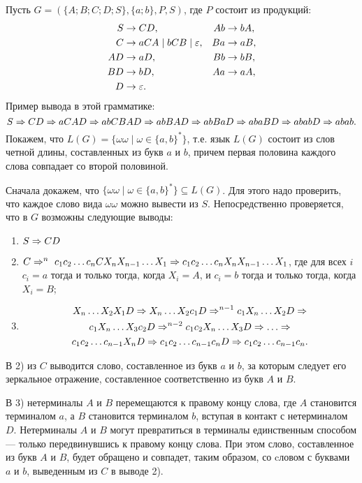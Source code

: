 \begin{myexample}
\label{exampleFreeGrammar}
Пусть $G=(\{A;B;C;D;S\},\{a;b\},P,S)$, где $P$ состоит из продукций:
\begin{align*}
	S  &\to CD, &
    Ab &\to bA, \\
	C  &\to aCA \mid bCB \mid \varepsilon, &
    Ba &\to aB, \\
	AD &\to aD, &
    Bb &\to bB, \\
	BD &\to bD, &
    Aa &\to aA,\\
	D  &\to \varepsilon.
\end{align*}
Пример вывода в этой грамматике:
\[
	S \Rightarrow CD \Rightarrow aCAD \Rightarrow abCBAD \Rightarrow abBAD \Rightarrow abBaD \Rightarrow abaBD \Rightarrow ababD \Rightarrow abab.
\]
Покажем, что $L(G)=\{\omega\omega\mid\omega\in\{a,b\}^*\}$, т.е. язык $L(G)$ состоит из слов четной длины, составленных из букв $a$ и $b$, причем первая половина каждого слова совпадает со второй половиной.

Сначала докажем, что $\{\omega\omega\mid\omega\in\{a,b\}^*\}\subseteq L(G)$. Для этого надо проверить, что каждое слово вида $\omega\omega$ можно вывести из $S$. Непосредственно проверяется, что в $G$ возможны следующие выводы:
\begin{enumerate}
	\item $S \Rightarrow CD$
	\item $C \Rightarrow^n~c_1c_2\ldots c_nCX_nX_{n-1}\ldots X_1 \Rightarrow c_1c_2\ldots c_nX_nX_{n-1}\ldots X_1$,  где для всех $i$ $c_i=a$ тогда и только тогда, когда $X_i=A$, и $c_i=b$ тогда и только тогда, когда $X_i=B$;
	\item
\begin{multline*}
    X_n\ldots X_2X_1D \To X_n\ldots X_2c_1D \To^{n-1} c_1X_n \ldots X_2D \To \\
     c_1X_n\ldots X_3c_2D \To^{n-2} c_1c_2X_n \ldots X_3D \To \dots \To \\
     c_1c_2\ldots c_{n-1}X_nD \To c_1c_2\ldots c_{n-1}c_nD \To c_1c_2\ldots c_{n-1}c_n.
\end{multline*}
\end{enumerate}

В 2) из $C$ выводится слово, составленное из букв $a$ и $b$, за которым следует его зеркальное отражение, составленное соответственно из букв $A$ и $B$.

В 3) нетерминалы $A$ и $B$ перемещаются к правому концу слова, где $A$ становится терминалом $a$, а $B$ становится терминалом $b$, вступая в контакт с нетерминалом $D$. Нетерминалы $A$ и $B$ могут превратиться в терминалы единственным способом --- только передвинувшись к правому концу слова. При этом слово, составленное из букв $A$ и $B$, будет обращено и совпадет, таким образом, со cловом с буквами $a$ и $b$, выведенным из $C$ в выводе 2).


\end{myexample}
